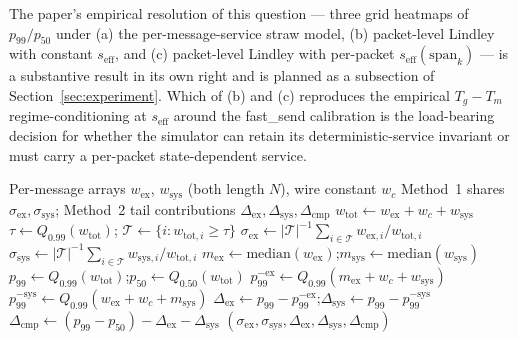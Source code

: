 \documentclass[11pt]{article}
\begin{document}
The paper's empirical resolution of this question --- three grid heatmaps of $p_{99}/p_{50}$ under (a) the per-message-service straw model, (b) packet-level Lindley with constant $s_{\mathrm{eff}}$, and (c) packet-level Lindley with per-packet $s_{\mathrm{eff}}(\text{span}_k)$ --- is a substantive result in its own right and is planned as a subsection of Section~\ref{sec:experiment}. Which of (b) and (c) reproduces the empirical $T_g - T_m$ regime-conditioning at $s_{\mathrm{eff}}$ around the fast\_send calibration is the load-bearing decision for whether the simulator can retain its deterministic-service invariant or must carry a per-packet state-dependent service.

\begin{algorithm}[htbp]
\caption{Per-window decomposition of joint tail latency into exchange and system contributions.}
\label{alg:decompose}
\begin{algorithmic}[1]
\Require Per-message arrays $w_{\mathrm{ex}}$, $w_{\mathrm{sys}}$ (both length $N$), wire constant $w_c$
\Ensure Method~1 shares $\sigma_{\mathrm{ex}}, \sigma_{\mathrm{sys}}$; Method~2 tail contributions $\Delta_{\mathrm{ex}}, \Delta_{\mathrm{sys}}, \Delta_{\mathrm{cmp}}$
\State $w_{\mathrm{tot}} \gets w_{\mathrm{ex}} + w_c + w_{\mathrm{sys}}$
\State $\tau \gets Q_{0.99}(w_{\mathrm{tot}})$; $\mathcal{T} \gets \{i : w_{\mathrm{tot},i} \geq \tau\}$
\State $\sigma_{\mathrm{ex}}  \gets |\mathcal{T}|^{-1} \sum_{i \in \mathcal{T}} w_{\mathrm{ex},i} / w_{\mathrm{tot},i}$
\State $\sigma_{\mathrm{sys}} \gets |\mathcal{T}|^{-1} \sum_{i \in \mathcal{T}} w_{\mathrm{sys},i} / w_{\mathrm{tot},i}$
\State $m_{\mathrm{ex}} \gets \mathrm{median}(w_{\mathrm{ex}})$;\quad $m_{\mathrm{sys}} \gets \mathrm{median}(w_{\mathrm{sys}})$
\State $p_{99} \gets Q_{0.99}(w_{\mathrm{tot}})$;\quad $p_{50} \gets Q_{0.50}(w_{\mathrm{tot}})$
\State $p_{99}^{-\mathrm{ex}}  \gets Q_{0.99}(m_{\mathrm{ex}} + w_c + w_{\mathrm{sys}})$
\State $p_{99}^{-\mathrm{sys}} \gets Q_{0.99}(w_{\mathrm{ex}} + w_c + m_{\mathrm{sys}})$
\State $\Delta_{\mathrm{ex}}  \gets p_{99} - p_{99}^{-\mathrm{ex}}$;\quad $\Delta_{\mathrm{sys}} \gets p_{99} - p_{99}^{-\mathrm{sys}}$
\State $\Delta_{\mathrm{cmp}} \gets (p_{99} - p_{50}) - \Delta_{\mathrm{ex}} - \Delta_{\mathrm{sys}}$
\State \Return $(\sigma_{\mathrm{ex}}, \sigma_{\mathrm{sys}}, \Delta_{\mathrm{ex}}, \Delta_{\mathrm{sys}}, \Delta_{\mathrm{cmp}})$
\end{algorithmic}
\end{algorithm}
\end{document}
